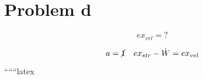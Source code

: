 \section*{Problem d}

\[
ex_{vel} = ?
\]

\[
a = \cancel{1} \quad ex_{str} - \dot{W} = ex_{vel}
\]

``````latex